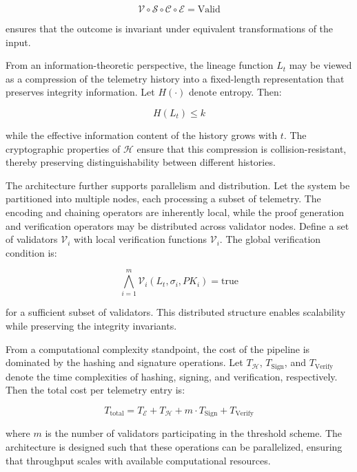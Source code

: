 \begin{equation}
\mathcal{V} \circ \mathcal{S} \circ \mathcal{C} \circ \mathcal{E} = \text{Valid}
\end{equation}

ensures that the outcome is invariant under equivalent transformations of the input.

From an information-theoretic perspective, the lineage function $L_t$ may be viewed as a compression of the telemetry history into a fixed-length representation that preserves integrity information. Let $H(\cdot)$ denote entropy. Then:

\begin{equation}
H(L_t) \leq k
\end{equation}

while the effective information content of the history grows with $t$. The cryptographic properties of $\mathcal{H}$ ensure that this compression is collision-resistant, thereby preserving distinguishability between different histories.

The architecture further supports parallelism and distribution. Let the system be partitioned into multiple nodes, each processing a subset of telemetry. The encoding and chaining operators are inherently local, while the proof generation and verification operators may be distributed across validator nodes. Define a set of validators $\mathcal{V}_i$ with local verification functions $\mathcal{V}_i$. The global verification condition is:

\begin{equation}
\bigwedge_{i=1}^{m} \mathcal{V}_i(L_t, \sigma_i, PK_i) = \text{true}
\end{equation}

for a sufficient subset of validators. This distributed structure enables scalability while preserving the integrity invariants.

From a computational complexity standpoint, the cost of the pipeline is dominated by the hashing and signature operations. Let $T_{\mathcal{H}}$, $T_{\text{Sign}}$, and $T_{\text{Verify}}$ denote the time complexities of hashing, signing, and verification, respectively. Then the total cost per telemetry entry is:

\begin{equation}
T_{\text{total}} = T_{\mathcal{E}} + T_{\mathcal{H}} + m \cdot T_{\text{Sign}} + T_{\text{Verify}}
\end{equation}

where $m$ is the number of validators participating in the threshold scheme. The architecture is designed such that these operations can be parallelized, ensuring that throughput scales with available computational resources.

